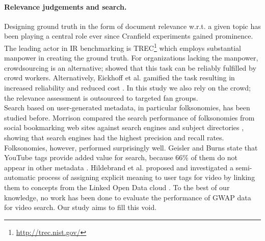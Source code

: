 \paragraph{Relevance judgements and search.}Designing ground truth in the form of document relevance w.r.t. a given topic has been playing a central role ever since Cranfield experiments gained prominence\cite{vorhees}. The leading actor in IR benchmarking is TREC\footnote{\url{http://trec.nist.gov/}} which employs substantial manpower in creating the ground truth. For organizations lacking the manpower, crowdsourcing is an alternative; \cite{rjturk1,rjturk2} showed that this task can be reliably fulfilled by crowd workers. Alternatively, Eickhoff et al. gamified the task resulting in increased reliability and reduced cost \cite{rjgame}. In this study we also rely on the crowd; the relevance assessment is outsourced to targeted fan groups.\\
Search based on user-generated metadata, in particular folksonomies, has been studied before. Morrison compared the search performance of folksonomies from social bookmarking web sites against search engines and subject directories \cite{morison}, showing that search engines had the highest precision and recall rates. Folksonomies, however, performed surprisingly well. Geisler and Burns state that YouTube tags provide added value for search, because 66\% of them do not appear in  other metadata \cite{youtube}. Hildebrand et al. proposed and investigated a semi-automatic process of assigning explicit meaning to user tags for video by linking them to concepts from the Linked Open Data cloud \cite{michiel}. To the best of our knowledge, no work has been done to evaluate the performance of GWAP data for video search. Our study aims to fill this void.

